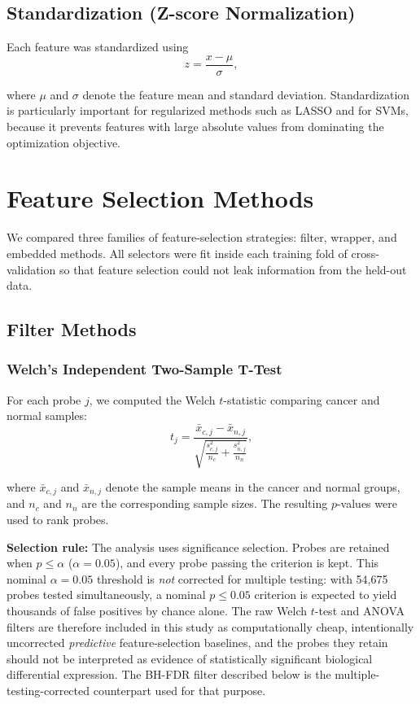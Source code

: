 \subsection{Standardization (Z-score Normalization)}

Each feature was standardized using
\begin{equation}
    z = \frac{x - \mu}{\sigma},
\end{equation}

where $\mu$ and $\sigma$ denote the feature mean and standard deviation. Standardization is particularly important for regularized methods such as LASSO and for SVMs, because it prevents features with large absolute values from dominating the optimization objective.

\section{Feature Selection Methods}

We compared three families of feature-selection strategies: filter, wrapper, and embedded methods. All selectors were fit inside each training fold of cross-validation so that feature selection could not leak information from the held-out data.

\subsection{Filter Methods}

\subsubsection{Welch's Independent Two-Sample T-Test}

For each probe $j$, we computed the Welch $t$-statistic comparing cancer and normal samples:
\begin{equation}
    t_j = \frac{\bar{x}_{c,j} - \bar{x}_{n,j}}{\sqrt{\frac{s_{c,j}^2}{n_c} + \frac{s_{n,j}^2}{n_n}}},
\end{equation}

where $\bar{x}_{c,j}$ and $\bar{x}_{n,j}$ denote the sample means in the cancer and normal groups, and $n_c$ and $n_n$ are the corresponding sample sizes. The resulting $p$-values were used to rank probes.

\textbf{Selection rule:} The analysis uses significance selection. Probes are retained when $p \leq \alpha$ ($\alpha = 0.05$), and every probe passing the criterion is kept. This nominal $\alpha = 0.05$ threshold is \emph{not} corrected for multiple testing: with 54,675 probes tested simultaneously, a nominal $p \leq 0.05$ criterion is expected to yield thousands of false positives by chance alone. The raw Welch $t$-test and ANOVA filters are therefore included in this study as computationally cheap, intentionally uncorrected \emph{predictive} feature-selection baselines, and the probes they retain should not be interpreted as evidence of statistically significant biological differential expression. The BH-FDR filter described below is the multiple-testing-corrected counterpart used for that purpose.

